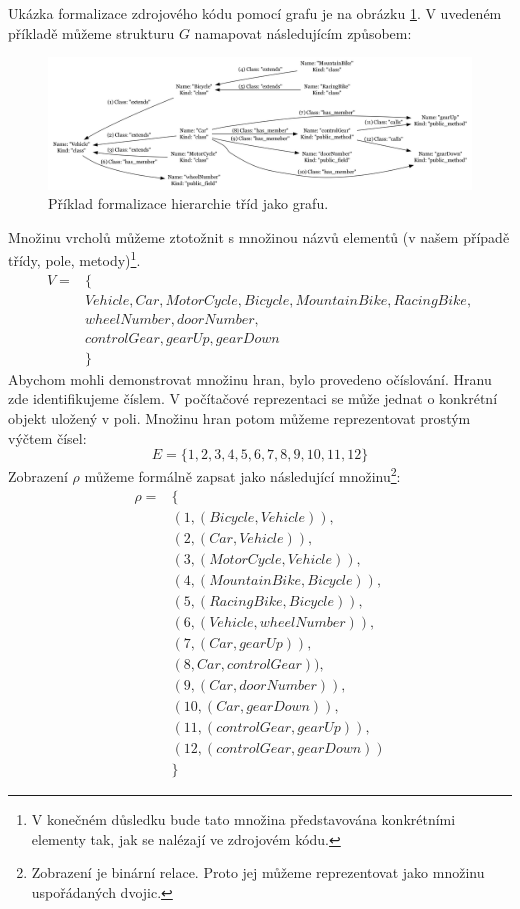 Ukázka formalizace zdrojového kódu pomocí grafu je na obrázku \ref{design-graph_example}. V uvedeném příkladě můžeme strukturu $G$ namapovat následujícím způsobem:
\begin{figure}[h!]
  \centering
  \includegraphics[width=1.0\textwidth]{./graphs/graph_example.png}
  \caption{Příklad formalizace hierarchie tříd jako grafu.\label{design-graph_example}}
\end{figure}
Množinu vrcholů můžeme ztotožnit s množinou názvů elementů (v našem případě třídy, pole, metody)\footnote{V konečném důsledku bude tato množina představována konkrétními elementy tak, jak se nalézají ve zdrojovém kódu.}.
\begin{align*}
  V = &\{ \\
  &Vehicle, Car, MotorCycle, Bicycle, MountainBike, RacingBike, \\
  &wheelNumber, doorNumber, \\
  &controlGear, gearUp, gearDown \\
  &\}
\end{align*}
Abychom mohli demonstrovat množinu hran, bylo provedeno očíslování. Hranu zde identifikujeme číslem. V počítačové reprezentaci se může jednat o konkrétní objekt uložený v poli. Množinu hran potom můžeme reprezentovat prostým výčtem čísel:
\begin{displaymath}
  E = \{1, 2, 3, 4, 5, 6, 7, 8, 9, 10, 11, 12\}
\end{displaymath}
Zobrazení $\rho$ můžeme formálně zapsat jako následující množinu\footnote{Zobrazení je binární relace. Proto jej můžeme reprezentovat jako množinu uspořádaných dvojic.}:
\begin{align*}
  \rho = &\{ \\
  &(1, (Bicycle, Vehicle)), \\
  &(2, (Car, Vehicle)), \\
  &(3, (MotorCycle, Vehicle)), \\
  &(4, (MountainBike, Bicycle)), \\
  &(5, (RacingBike, Bicycle)), \\
  &(6, (Vehicle, wheelNumber)), \\
  &(7, (Car, gearUp)), \\
  &(8, Car, controlGear)), \\
  &(9, (Car, doorNumber)), \\
  &(10, (Car, gearDown)), \\
  &(11, (controlGear, gearUp)), \\
  &(12, (controlGear, gearDown)) \\
  &\}
\end{align*}
